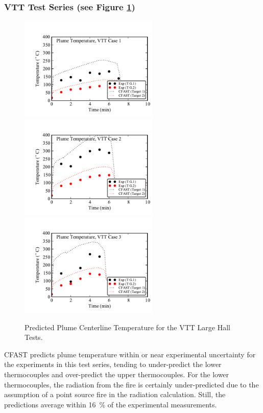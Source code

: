 \subsubsection{VTT Test Series (see Figure \ref{fig:VTT_Plume})}

\begin{figure}[p]
\begin{center}
\includegraphics[width=2.6in]{FIGURES/VTT/VTT_01_Plume_Temperature} \\
\includegraphics[width=2.6in]{FIGURES/VTT/VTT_02_Plume_Temperature} \\
\includegraphics[width=2.6in]{FIGURES/VTT/VTT_03_Plume_Temperature} 
\end{center}
\caption{Predicted Plume Centerline Temperature for the VTT Large Hall Tests.} \label{fig:VTT_Plume}
\end{figure}

CFAST predicts plume temperature within or near experimental uncertainty for the experiments in this test series, tending to under-predict the lower thermocouples and over-predict the upper thermocouples. For the lower thermocouples, the radiation from the fire is certainly under-predicted due to the assumption of a point source fire in the radiation calculation.	Still, the predictions average within 16~\% of the experimental measurements.

